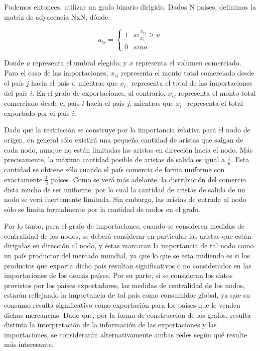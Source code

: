 \documentclass[a4paper]{article}
\begin{document}
Podemos entonces, utilizar un grafo binario dirigido. Dados N países, definimos la matriz de adyacencia NxN, dónde:

$$
a_{ij} = 
 \begin{cases} 
      1 & si \frac{x_{ij}}{x_{i\cdot}}\geq u \\
      0 & sino 
  \end{cases}
$$

Donde $u$ representa el umbral elegido, y $x$ representa el volumen comerciado.   
Para el caso de las importaciones, $x_{ij}$ representa el monto total comerciado desde el país $j$ hacia el país $i$, mientras que $x_{i\cdot}$ representa el total de las importaciones del país $i$. En el grafo de exportaciones, al contrario, $x_{ij}$ representa el monto total comerciado desde el país $i$ hacia el país $j$, mientras que $x_{i\cdot}$ representa el total exportado por el país $i$.          

Dado que la restricción se construye por la importancia relativa para el nodo de origen, en general sólo existirá una pequeña cantidad de aristas que salgan de cada nodo, aunque no están limitadas las aristas en dirección hacia el nodo. Más precisamente, la máxima cantidad posible de aristas de salida es igual a $\frac{1}{u}$. Esta cantidad se obtiene sólo cuando el país comercia de forma uniforme con exactamente $\frac{1}{u}$ países. Como se verá más adelante, la distribución del comercio dista mucho de ser uniforme, por lo cual la cantidad de aristas de salida de un nodo se verá fuertemente limitada. Sin embargo, las aristas de entrada al nodo sólo se limita formalmente por la cantidad de nodos en el grafo. 

Por lo tanto, para el grafo de importaciones, cuando se consideren medidas de centralidad de los nodos, se deberá considerar en particular las aristas que están dirigidas en dirección al nodo, y éstas marcaran la importancia de tal nodo como un país productor del mercado mundial, ya que lo que se esta midiendo es si los productos que exporta dicho país resultan significativos o no considerados en las importaciones de los demás países. Por su parte, si se consideran los datos provistos por los países exportadores, las medidas de centralidad de los nodos, estarán reflejando la importancia de tal país como consumidor global, ya que su consumo resulta significativo como exportación para los países que le venden dichas mercancías. 
Dado que, por la forma de construcción de los grafos, resulta distinta la interpretación de la información de las exportaciones y las importaciones, se considerarán alternativamente ambas redes según qué resulte más interesante. 
\end{document}
